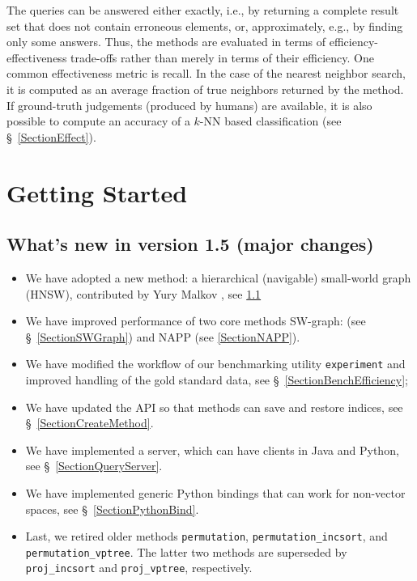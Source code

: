 \documentclass[runningheads,a4paper]{llncs}
\newcommand{\todonote}[1]{\todo[color=red!40,caption={TODO}]{#1}}
\newcommand{\ttt}[1]{\texttt{#1}}
\newcommand{\knn}{$k$-NN }
\newcommand{\LibVersion}{1.5}
\begin{document}
{The queries can be answered either exactly, 
i.e., by returning a complete result set that does not contain erroneous elements, or, 
approximately, e.g., by finding only some answers.
Thus, the methods are evaluated in terms of efficiency-effectiveness trade-offs
rather than merely in terms of their efficiency.
One common effectiveness metric is recall. In the case
of the nearest neighbor search, it is computed as
an average fraction of true neighbors returned by the method.
If ground-truth judgements (produced by humans) are available,
it is also possible to compute an accuracy of a \knn based classification
(see \S~\ref{SectionEffect}).


\section{Getting Started}

\subsection{What's new in version \LibVersion{} (major changes)} 
\begin{itemize}
\item We have adopted a new method: a hierarchical (navigable) small-world graph (HNSW),
      contributed by Yury Malkov \cite{Malkov2016}, see \ref{} \todonote{add a reference}
\item We have improved performance of two core methods SW-graph: (see \S~\ref{SectionSWGraph}) and NAPP (see \ref{SectionNAPP}).
\item We have modified the workflow of our benchmarking utility \ttt{experiment}
and improved handling of the gold standard data, see \S~\ref{SectionBenchEfficiency};
\item We have updated the API so that methods can save and restore indices, see \S~\ref{SectionCreateMethod}.
\item We have implemented a server, which can have clients in Java and Python, see \S~\ref{SectionQueryServer}. 
\item We have implemented generic Python bindings that can work for non-vector spaces, see \S~\ref{SectionPythonBind}.
\item Last, we retired older methods \ttt{permutation}, \ttt{permutation\_incsort}, and \ttt{permutation\_vptree}. 
The latter two methods are superseded by \ttt{proj\_incsort} and \ttt{proj\_vptree}, respectively.
\end{itemize}

}
\end{document}
